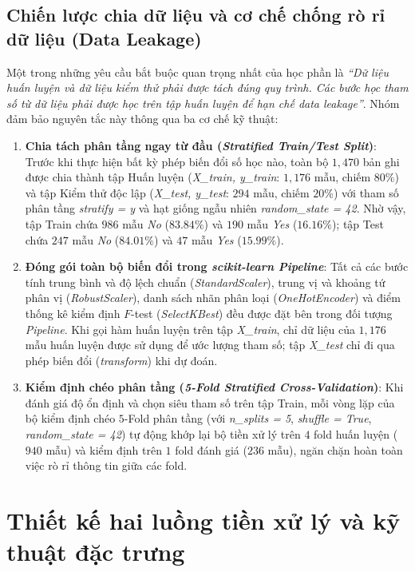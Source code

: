 \subsection{Chiến lược chia dữ liệu và cơ chế chống rò rỉ dữ liệu (Data Leakage)}
Một trong những yêu cầu bắt buộc quan trọng nhất của học phần là \textit{``Dữ liệu huấn luyện và dữ liệu kiểm thử phải được tách đúng quy trình. Các bước học tham số từ dữ liệu phải được học trên tập huấn luyện để hạn chế data leakage''}. Nhóm đảm bảo nguyên tắc này thông qua ba cơ chế kỹ thuật:
\begin{enumerate}
    \item \textbf{Chia tách phân tầng ngay từ đầu (\textit{Stratified Train/Test Split})}: Trước khi thực hiện bất kỳ phép biến đổi số học nào, toàn bộ $1,470$ bản ghi được chia thành tập Huấn luyện (\textit{X\_train, y\_train}: $1,176$ mẫu, chiếm $80\%$) và tập Kiểm thử độc lập (\textit{X\_test, y\_test}: $294$ mẫu, chiếm $20\%$) với tham số phân tầng \textit{stratify = y} và hạt giống ngẫu nhiên \textit{random\_state = 42}. Nhờ vậy, tập Train chứa $986$ mẫu \textit{No} ($83.84\%$) và $190$ mẫu \textit{Yes} ($16.16\%$); tập Test chứa $247$ mẫu \textit{No} ($84.01\%$) và $47$ mẫu \textit{Yes} ($15.99\%$).
    \item \textbf{Đóng gói toàn bộ biến đổi trong \textit{scikit-learn Pipeline}}: Tất cả các bước tính trung bình và độ lệch chuẩn (\textit{StandardScaler}), trung vị và khoảng tứ phân vị (\textit{RobustScaler}), danh sách nhãn phân loại (\textit{OneHotEncoder}) và điểm thống kê kiểm định $F$-test (\textit{SelectKBest}) đều được đặt bên trong đối tượng \textit{Pipeline}. Khi gọi hàm huấn luyện trên tập \textit{X\_train}, chỉ dữ liệu của $1,176$ mẫu huấn luyện được sử dụng để ước lượng tham số; tập \textit{X\_test} chỉ đi qua phép biến đổi (\textit{transform}) khi dự đoán.
    \item \textbf{Kiểm định chéo phân tầng (\textit{5-Fold Stratified Cross-Validation})}: Khi đánh giá độ ổn định và chọn siêu tham số trên tập Train, mỗi vòng lặp của bộ kiểm định chéo $5$-Fold phân tầng (với \textit{n\_splits = 5}, \textit{shuffle = True}, \textit{random\_state = 42}) tự động khớp lại bộ tiền xử lý trên $4$ fold huấn luyện ($940$ mẫu) và kiểm định trên $1$ fold đánh giá ($236$ mẫu), ngăn chặn hoàn toàn việc rò rỉ thông tin giữa các fold.
\end{enumerate}

\section{Thiết kế hai luồng tiền xử lý và kỹ thuật đặc trưng}

